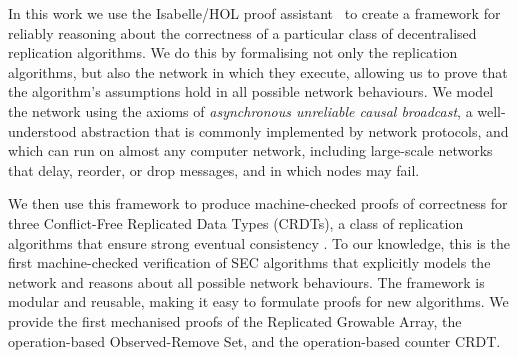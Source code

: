 \documentclass[11pt,a4paper]{article}
\begin{document}
In this work we use the Isabelle/HOL proof assistant~\cite{DBLP:conf/tphol/WenzelPN08} to create a framework for reliably reasoning about the correctness of a particular class of decentralised replication algorithms.
We do this by formalising not only the replication algorithms, but also the network in which they execute, allowing us to prove that the algorithm's assumptions hold in all possible network behaviours.
We model the network using the axioms of \emph{asynchronous unreliable causal broadcast}, a well-understood abstraction that is commonly implemented by network protocols, and which can run on almost any computer network, including large-scale networks that delay, reorder, or drop messages, and in which nodes may fail.

We then use this framework to produce machine-checked proofs of correctness for three Conflict-Free Replicated Data Types (CRDTs), a class of replication algorithms that ensure strong eventual consistency \cite{Shapiro:2011wy,Shapiro:2011un}.
To our knowledge, this is the first machine-checked verification of SEC algorithms that explicitly models the network and reasons about all possible network behaviours.
The framework is modular and reusable, making it easy to formulate proofs for new algorithms.
We provide the first mechanised proofs of the Replicated Growable Array, the operation-based Observed-Remove Set, and the operation-based counter CRDT.





\end{document}
